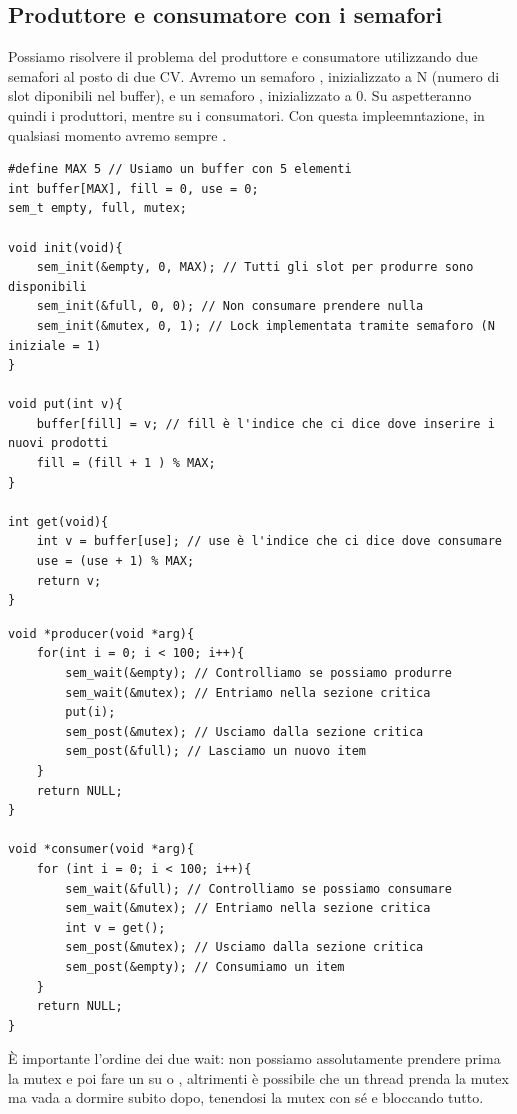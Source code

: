 \documentclass[11pt, a4paper, titlepage, oneside]{scrbook}
\begin{document}
\subsection{Produttore e consumatore con i semafori}

Possiamo risolvere il problema del produttore e consumatore utilizzando due semafori al posto di due CV. Avremo un semaforo , inizializzato a N (numero di slot diponibili nel buffer), e un semaforo , inizializzato a 0. Su  aspetteranno quindi i produttori, mentre su  i consumatori. Con questa impleemntazione, in qualsiasi momento avremo sempre .

\begin{lstlisting}[style=C]
#define MAX 5 // Usiamo un buffer con 5 elementi
int buffer[MAX], fill = 0, use = 0;
sem_t empty, full, mutex;

void init(void){
    sem_init(&empty, 0, MAX); // Tutti gli slot per produrre sono disponibili
    sem_init(&full, 0, 0); // Non consumare prendere nulla
    sem_init(&mutex, 0, 1); // Lock implementata tramite semaforo (N iniziale = 1)
}

void put(int v){ 
    buffer[fill] = v; // fill è l'indice che ci dice dove inserire i nuovi prodotti
    fill = (fill + 1 ) % MAX;
}

int get(void){
    int v = buffer[use]; // use è l'indice che ci dice dove consumare
    use = (use + 1) % MAX;
    return v;
}
\end{lstlisting}

\begin{lstlisting}[style=C]
void *producer(void *arg){
    for(int i = 0; i < 100; i++){
        sem_wait(&empty); // Controlliamo se possiamo produrre
        sem_wait(&mutex); // Entriamo nella sezione critica
        put(i);
        sem_post(&mutex); // Usciamo dalla sezione critica
        sem_post(&full); // Lasciamo un nuovo item
    }
    return NULL;
}

void *consumer(void *arg){
    for (int i = 0; i < 100; i++){
        sem_wait(&full); // Controlliamo se possiamo consumare
        sem_wait(&mutex); // Entriamo nella sezione critica
        int v = get();
        sem_post(&mutex); // Usciamo dalla sezione critica
        sem_post(&empty); // Consumiamo un item
    }
    return NULL;
}
\end{lstlisting}

\NB È importante l'ordine dei due wait: non possiamo assolutamente prendere prima la mutex e poi fare un  su  o , altrimenti è possibile che un thread prenda la mutex ma vada a dormire subito dopo, tenendosi la mutex con sé e bloccando tutto.
\end{document}
